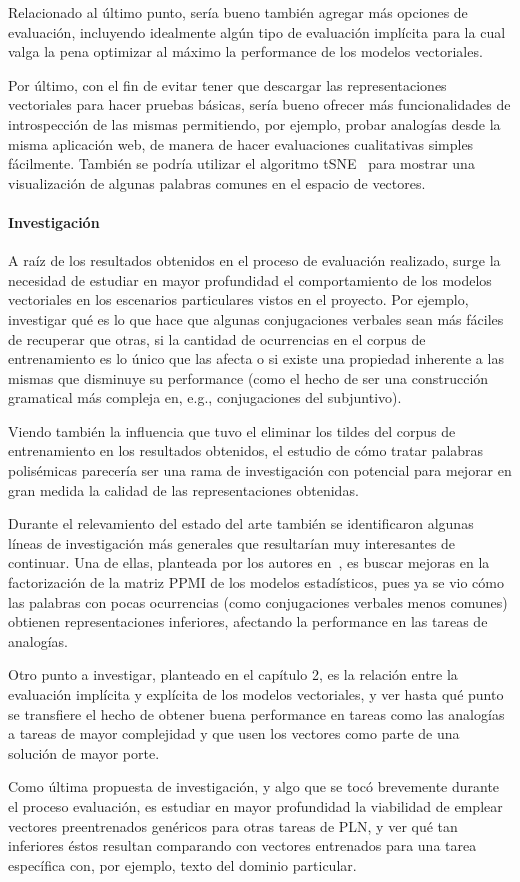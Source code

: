 Relacionado al último punto, sería bueno también agregar más opciones de evaluación, incluyendo
idealmente algún tipo de evaluación implícita para la cual valga la pena optimizar al máximo la
performance de los modelos vectoriales.

Por último, con el fin de evitar tener que descargar las representaciones vectoriales para hacer
pruebas básicas, sería bueno ofrecer más funcionalidades de introspección de las mismas permitiendo,
por ejemplo, probar analogías desde la misma aplicación web, de manera de hacer evaluaciones
cualitativas simples fácilmente. También se podría utilizar el algoritmo tSNE~\cite{tSNE} para
mostrar una visualización de algunas palabras comunes en el espacio de vectores.


\paragraph{Investigación}

A raíz de los resultados obtenidos en el proceso de evaluación realizado, surge la necesidad de
estudiar en mayor profundidad el comportamiento de los modelos vectoriales en los escenarios
particulares vistos en el proyecto. Por ejemplo, investigar qué es lo que hace que algunas
conjugaciones verbales sean más fáciles de recuperar que otras, si la cantidad de ocurrencias en el
corpus de entrenamiento es lo único que las afecta o si existe una propiedad inherente a las mismas
que disminuye su performance (como el hecho de ser una construcción gramatical más compleja en,
e.g., conjugaciones del subjuntivo).

Viendo también la influencia que tuvo el eliminar los tildes del corpus de entrenamiento en los
resultados obtenidos, el estudio de cómo tratar palabras polisémicas parecería ser una rama de
investigación con potencial para mejorar en gran medida la calidad de las representaciones
obtenidas.


Durante el relevamiento del estado del arte también se identificaron algunas líneas de investigación
más generales que resultarían muy interesantes de continuar. Una de ellas, planteada por los autores
en~\cite{Levy2014a}, es buscar mejoras en la factorización de la matriz PPMI de los modelos
estadísticos, pues ya se vio cómo las palabras con pocas ocurrencias (como conjugaciones verbales
menos comunes) obtienen representaciones inferiores, afectando la performance en las tareas de
analogías.

Otro punto a investigar, planteado en el capítulo 2, es la relación entre la evaluación implícita y
explícita de los modelos vectoriales, y ver hasta qué punto se transfiere el hecho de obtener buena
performance en tareas como las analogías a tareas de mayor complejidad y que usen los vectores como
parte de una solución de mayor porte.

Como última propuesta de investigación, y algo que se tocó brevemente durante el proceso evaluación,
es estudiar en mayor profundidad la viabilidad de emplear vectores preentrenados genéricos para
otras tareas de PLN, y ver qué tan inferiores éstos resultan comparando con vectores entrenados para
una tarea específica con, por ejemplo, texto del dominio particular.
